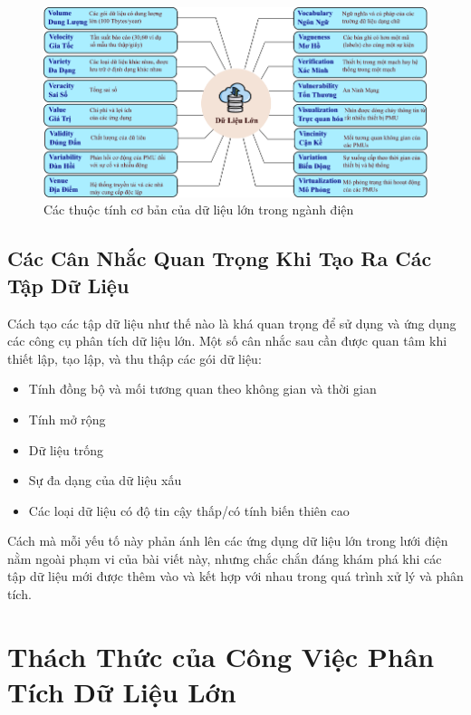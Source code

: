 \documentclass[utf8]{frontiersSCNS} %
\begin{document}
\begin{figure}[h!]
\centering
	\begin{center}
		\includegraphics[width=\textwidth]{big-data-properties-VN}%
	\end{center}
	\caption{Các thuộc tính cơ bản của dữ liệu lớn trong ngành điện}\label{fig:1}
\end{figure}


\subsection{Các Cân Nhắc Quan Trọng Khi Tạo Ra Các Tập Dữ Liệu}

Cách tạo các tập dữ liệu như thế nào là khá quan trọng để sử dụng và ứng dụng các công cụ phân tích dữ liệu lớn. Một số cân nhắc sau cần được quan tâm khi thiết lập, tạo lập, và thu thập các gói dữ liệu: 

\begin{itemize}
\item Tính đồng bộ và mối tương quan theo không gian và thời gian
\item Tính mở rộng
\item Dữ liệu trống
\item Sự đa dạng của dữ liệu xấu
\item Các loại dữ liệu có độ tin cậy thấp/có tính biến thiên cao
\end{itemize}

Cách mà mỗi yếu tố này phản ánh lên các ứng dụng dữ liệu lớn trong lưới điện nằm ngoài phạm vi của bài viết này, nhưng chắc chắn đáng khám phá khi các tập dữ liệu mới được thêm vào và kết hợp với nhau trong quá trình xử lý và phân tích.

\section{Thách Thức của Công Việc Phân Tích Dữ Liệu Lớn}
\end{document}

